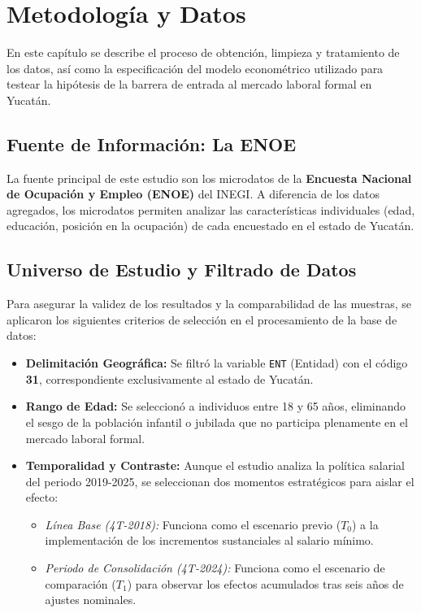 \section{Metodología y Datos}

En este capítulo se describe el proceso de 
obtención, limpieza y tratamiento de los datos, así como la especificación del modelo econométrico utilizado para testear la hipótesis de la barrera de entrada al mercado laboral formal en Yucatán.

\subsection{Fuente de Información: La ENOE}
La fuente principal de este estudio son los microdatos de la \textbf{Encuesta Nacional de Ocupación y Empleo (ENOE)} del INEGI. A diferencia de los datos agregados, los microdatos permiten analizar las características individuales (edad, educación, posición en la ocupación) de cada encuestado en el estado de Yucatán.

\subsection{Universo de Estudio y Filtrado de Datos}
Para asegurar la validez de los resultados y la comparabilidad de las muestras, se aplicaron los siguientes criterios de selección en el procesamiento de la base de datos:

\begin{itemize}
    \item \textbf{Delimitación Geográfica:} Se filtró la variable \texttt{ENT} (Entidad) con el código \textbf{31}, correspondiente exclusivamente al estado de Yucatán.
    \item \textbf{Rango de Edad:} Se seleccionó a individuos entre 18 y 65 años, eliminando el sesgo de la población infantil o jubilada que no participa plenamente en el mercado laboral formal.
    \item \textbf{Temporalidad y Contraste:} Aunque el estudio analiza la política salarial del periodo 2019-2025, se seleccionan dos momentos estratégicos para aislar el efecto:
    \begin{itemize}
        \item \textit{Línea Base (4T-2018):} Funciona como el escenario previo ($T_0$) a la implementación de los incrementos sustanciales al salario mínimo.
        \item \textit{Periodo de Consolidación (4T-2024):} Funciona como el escenario de comparación ($T_1$) para observar los efectos acumulados tras seis años de ajustes nominales.
    \end{itemize}
\end{itemize}

